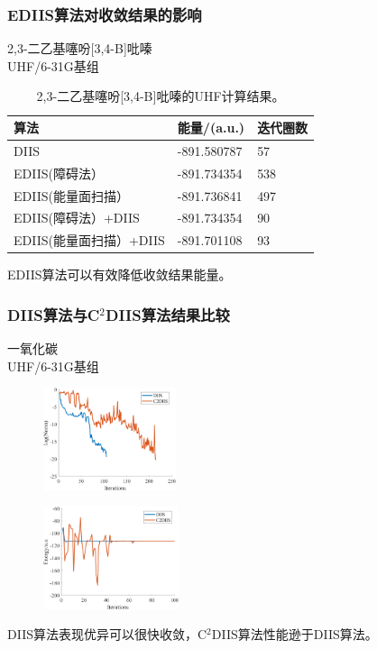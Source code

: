 \documentclass[10pt,aspectratio=43,mathserif,UTF8]{beamer}
\begin{document}
\begin{frame}
	\frametitle{EDIIS算法对收敛结果的影响}
	2,3-二乙基噻吩[3,4-B]吡嗪\\
	UHF/6-31G基组
	\begin{table}[htbp]
		\caption{2,3-二乙基噻吩[3,4-B]吡嗪的UHF计算结果。}\label{table:AA4}
		\setlength{\belowcaptionskip}{7pt}
		\centering
		\begin{tabular}{l l l}
			\toprule
			\textbf{算法}			&\textbf{能量/(a.u.)}	&\textbf{迭代圈数}\\
			\midrule
			DIIS						& -891.580787		&57\\
			EDIIS(障碍法）				& -891.734354		&538\\
			EDIIS(能量面扫描）			&-891.736841		&497\\
			EDIIS(障碍法）+DIIS			& -891.734354		&90\\
			EDIIS(能量面扫描）+DIIS		&-891.701108		&93\\
			\bottomrule
		\end{tabular}
		\vspace{0.2cm}
	\end{table}
	\centerline{EDIIS算法可以有效降低收敛结果能量。}
\end{frame}

\begin{frame}
	\frametitle{DIIS算法与C$^2$DIIS算法结果比较}
	一氧化碳\\
	UHF/6-31G基组
	\begin{figure}[ht!]
		\centering
		\begin{minipage}{0.4\linewidth}
			\centering
			\includegraphics[height=3cm]{figure/co/LOG2.png}
			\label{fig:co:lognorm}
		\end{minipage}
		\begin{minipage}{0.4\linewidth}
			\centering
			\includegraphics[height=3cm]{figure/co/E3.png}
			\label{fig:co:E}
		\end{minipage}
		\label{fig:co}
	\end{figure}
	\centerline{DIIS算法表现优异可以很快收敛，C$^2$DIIS算法性能逊于DIIS算法。}
\end{frame}
\end{document}
